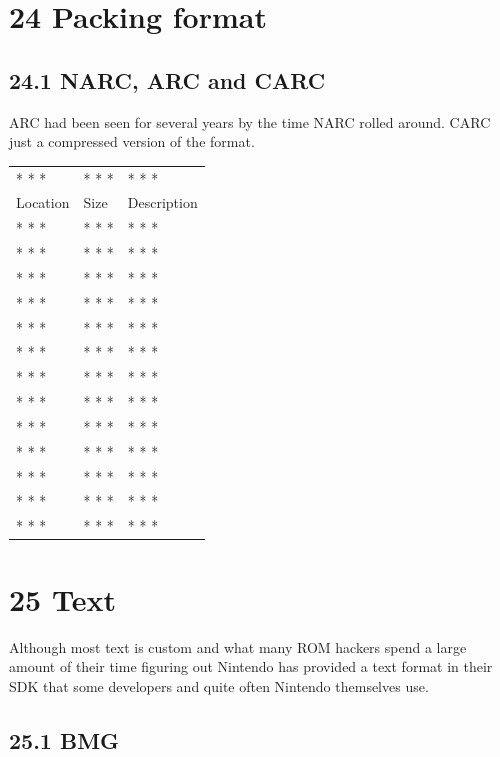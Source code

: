\documentclass[
]{book}
\begin{document}
\hypertarget{packing-format}{%
\chapter{24 Packing format}\label{packing-format}}

\hypertarget{narc-arc-and-carc}{%
\section{24.1 NARC, ARC and CARC}\label{narc-arc-and-carc}}

ARC had been seen for several years by the time NARC rolled around. CARC just a compressed version of the format.

\begin{longtable}[]{@{}lll@{}}
\toprule()
\endhead
* * * & * * * & * * * \\
Location & Size & Description \\
* * * & * * * & * * * \\
* * * & * * * & * * * \\
* * * & * * * & * * * \\
* * * & * * * & * * * \\
* * * & * * * & * * * \\
* * * & * * * & * * * \\
* * * & * * * & * * * \\
* * * & * * * & * * * \\
* * * & * * * & * * * \\
* * * & * * * & * * * \\
* * * & * * * & * * * \\
* * * & * * * & * * * \\
* * * & * * * & * * * \\
\bottomrule()
\end{longtable}

\hypertarget{text-1}{%
\chapter{25 Text}\label{text-1}}

Although most text is custom and what many ROM hackers spend a large amount of their time figuring out Nintendo has provided a text format in their SDK that some developers and quite often Nintendo themselves use.

\hypertarget{bmg}{%
\section{25.1 BMG}\label{bmg}}
\end{document}
